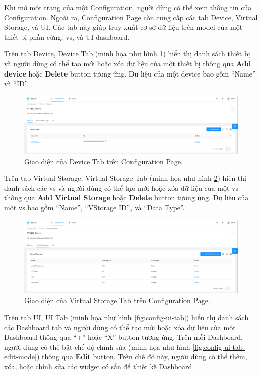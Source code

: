Khi mở một trang của một Configuration, người dùng có thể xem thông tin của Configuration. Ngoài ra, Configuration Page còn cung cấp các tab Device, Virtual Storage, và UI. Các tab này giúp truy xuất cơ sở dữ liệu trên model của một thiết bị phần cứng, \acrshort{vs}, và UI dashboard.

Trên tab Device, Device Tab (minh họa như hình \ref{fig:config-device-tab}) hiển thị danh sách thiết bị và người dùng có thể tạo mới hoặc xóa dữ liệu của một thiết bị thông qua \textbf{Add device} hoặc \textbf{Delete} button tương ứng. Dữ liệu của một device bao gồm ``Name'' và ``ID''.

\begin{figure}[htp]
\centering
\includegraphics[width=1.0\linewidth]{images/fig-config-device-tab.png}
\caption{Giao diện của Device Tab trên Configuration Page.}
\label{fig:config-device-tab}
\end{figure}

Trên tab Virtual Storage, Virtual Storage Tab (minh họa như hình \ref{fig:config-vstorage-tab}) hiển thị danh sách các \acrshort{vs} và người dùng có thể tạo mới hoặc xóa dữ liệu của một \acrshort{vs} thông qua \textbf{Add Virtual Storage} hoặc \textbf{Delete} button tương ứng. Dữ liệu của một \acrshort{vs} bao gồm ``Name'', ``VStorage ID'', và ``Data Type''.

\begin{figure}[htp]
\centering
\includegraphics[width=1.0\linewidth]{images/fig-config-vstorage-tab.png}
\caption{Giao diện của Virtual Storage Tab trên Configuration Page.}
\label{fig:config-vstorage-tab}
\end{figure}

Trên tab UI, UI Tab (minh họa như hình \ref{fig:config-ui-tab}) hiển thị danh sách các Dashboard tab và người dùng có thể tạo mới hoặc xóa dữ liệu của một Dashboard thông qua ``+'' hoặc ``X'' button tương ứng. Trên mỗi Dashboard, người dùng có thể bật chế độ chỉnh sửa (minh họa như hình \ref{fig:config-ui-tab-edit-mode}) thông qua \textbf{Edit} button. Trên chế độ này, người dùng có thể thêm, xóa, hoặc chỉnh sửa các widget có sẵn để thiết kế Dashboard.

